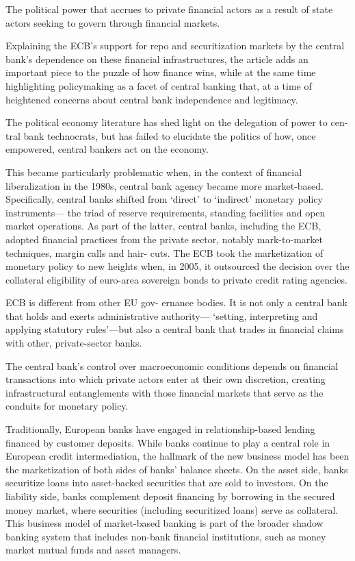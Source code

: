 \documentclass[
]{book}
\begin{document}
The political power that accrues to private financial actors as a result of
state actors seeking to govern through financial markets.

Explaining the ECB's support for repo and securitization markets by the central
bank's dependence on these financial infrastructures, the article adds an important piece to
the puzzle of how finance wins, while at the same time highlighting policymaking as a facet
of central banking that, at a time of heightened concerns about central bank independence
and legitimacy.

The political economy literature has shed light on the delegation of power to cen-
tral bank technocrats, but has failed to elucidate the politics of how, once empowered,
central bankers act on the economy.

This became particularly problematic when, in the context
of financial liberalization in the 1980s, central bank agency became more market-based.
Specifically, central banks shifted from `direct' to `indirect' monetary policy instruments---
the triad of reserve requirements, standing facilities and open market operations.
As part of the latter, central banks, including the ECB, adopted financial
practices from the private sector, notably mark-to-market techniques, margin calls and hair-
cuts.
The ECB took the marketization of monetary policy to new
heights when, in 2005, it outsourced the decision over the collateral eligibility of euro-area
sovereign bonds to private credit rating agencies.

ECB is different from other EU gov-
ernance bodies. It is not only a central bank that holds and exerts administrative authority---
`setting, interpreting and applying statutory rules'---but also a central bank that trades in
financial claims with other, private-sector banks.

The central bank's control over macroeconomic conditions depends on financial transactions
into which private actors enter at their own discretion, creating infrastructural entanglements with
those financial markets that serve as the conduits for monetary policy.

Traditionally, European banks have
engaged in relationship-based lending financed by customer deposits. While banks continue
to play a central role in European credit intermediation, the hallmark of the new business
model has been the marketization of both sides of banks' balance sheets.
On the asset side, banks securitize loans into asset-backed securities that are sold
to investors. On the liability side, banks complement deposit financing by borrowing in the
secured money market, where securities (including securitized loans) serve as collateral. This
business model of market-based banking is part of the broader shadow banking system that
includes non-bank financial institutions, such as money market mutual funds and asset managers.
\end{document}
